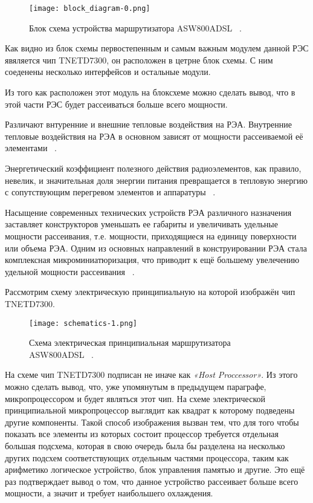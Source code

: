 \begin{figure}[h] %
  \centering
\texttt{[image: block\_diagram-0.png]}
\caption{Блок схема устройства маршрутизатора ASW800ADSL ~\cite{BLOCK_DIAGRAM}.}
\end{figure}
 
Как видно из блок схемы первостепенным и самым важным модулем данной
РЭС явяляется чип TNETD7300, он расположен в цетрне блок схемы. С ним
соеденены несколько интерфейсов и остальные модули.

Из того как расположен этот модуль на блоксхеме можно сделать вывод,
что в этой части РЭС будет рассеиваться больше всего мощности.

Различают внтуренние и внешние тепловые воздействия на РЭА.
Внутренние тепловые воздействия на РЭА в основном зависят от мощности
рассеиваемой её элементами ~\cite{Rotkop1976}.

Энергетический коэффициент полезного действия радиоэлементов, как
правило, невелик, и значительная доля энергии питания превращается в
тепловую энергию с сопутствующим перегревом элементов и аппаратуры
~\cite{Rotkop1976}.

Насыщение современных технических устройств РЭА различного назначения
заставляет конструкторов уменьшать ее габариты и увеличивать удельные
мощности рассеивания, т.е. мощности, приходящиеся на единицу
поверхности или объема РЭА. Одним из основных направлений в
конструировании РЭА стала комплексная микроминиатюризация, что
приводит к ещё большему увелечению удельной мощности рассеивания
~\cite{Rotkop1976}.

Рассмотрим схему электрическую принципиальную на которой изображён чип
TNETD7300.

\begin{figure}[hb]
  \centering
  \texttt{[image: schematics-1.png]}
  \caption{Схема электрическая принципиальная
    маршрутизатора ASW800ADSL ~\cite{SCHEMATICS}.}
\end{figure}

На схеме чип TNETD7300 подписан не иначе как \textit{«Host Proccessor»}.
Из этого можно сделать вывод, что, уже упомянутым в предыдущем
параграфе, микропроцессором и будет являться этот чип.  На схеме
электрической принципиальной микропроцессор выглядит как квадрат к
которому подведены другие компоненты. Такой способ изображения вызван
тем, что для того чтобы показать все элементы из которых состоит
процессор требуется отдельная большая подсхема, которая в свою очередь
была бы разделена на несколько других подсхем соответствующих
отдельным частями процессора, таким как арифметико логическое
устройство, блок управления памятью и другие. Это ещё раз подтверждает
вывод о том, что данное устройство рассеивает больше всего мощности, а
значит и требует наибольшего охлаждения.

